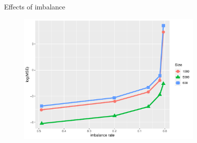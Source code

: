 \documentclass{beamer}
\begin{document}
    \begin{frame}{Effects of imbalance}
    \begin{figure}
        \centering
        \includegraphics[width=0.8\textwidth]{imbmse.pdf}
        \label{fig:imbmse}
    \end{figure}
        
    \end{frame}
\end{document}
